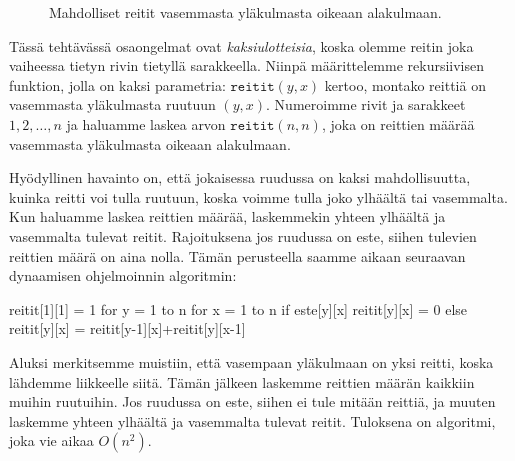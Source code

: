 \begin{figure}
\center
{}
\caption{Mahdolliset reitit vasemmasta yläkulmasta oikeaan alakulmaan.}
\label{fig:reiruu}
\end{figure}

Tässä tehtävässä osaongelmat ovat \emph{kaksiulotteisia},
koska olemme reitin joka vaiheessa tietyn rivin tietyllä sarakkeella.
Niinpä määritte\-lemme rekursiivisen funktion, jolla on kaksi
parametria: $\texttt{reitit}(y,x)$ kertoo, montako reittiä on
vasemmasta yläkulmasta ruutuun $(y,x)$.
Numeroimme rivit ja sarakkeet $1,2,\dots,n$
ja haluamme laskea arvon $\texttt{reitit}(n,n)$,
joka on reittien määrää vasemmasta yläkulmasta oikeaan alakulmaan.

Hyödyllinen havainto on, että jokaisessa ruudussa on kaksi
mahdollisuutta, kuinka reitti voi tulla ruutuun,
koska voimme tulla joko ylhäältä tai vasemmalta.
Kun haluamme laskea reittien määrää, laskemmekin yhteen ylhäältä
ja vasemmalta tulevat reitit.
Rajoituksena jos ruudussa on este, siihen tulevien reittien
määrä on aina nolla.
Tämän perusteella saamme aikaan seuraavan
dynaamisen ohjelmoinnin algoritmin:

\begin{code}
reitit[1][1] = 1
for y = 1 to n
    for x = 1 to n
        if este[y][x]
            reitit[y][x] = 0
        else
            reitit[y][x] = reitit[y-1][x]+reitit[y][x-1]
\end{code}

Aluksi merkitsemme muistiin, että vasempaan yläkulmaan on yksi reitti,
koska lähdemme liikkeelle siitä.
Tämän jälkeen laskemme reittien määrän kaikkiin muihin ruutuihin.
Jos ruudussa on este, siihen ei tule mitään reittiä,
ja muuten laskemme yhteen ylhäältä ja vasemmalta tulevat reitit.
Tuloksena on algoritmi, joka vie aikaa $O(n^2)$.

